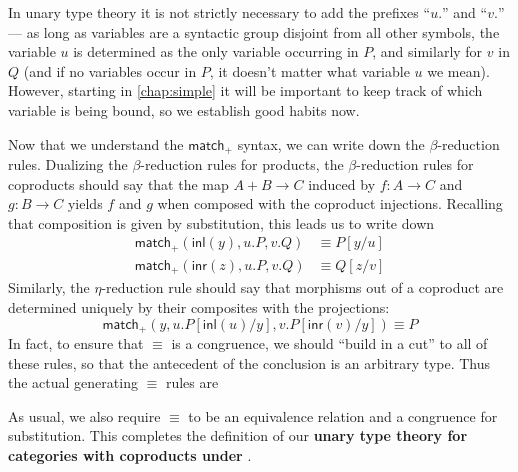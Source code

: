 \documentclass{book}
\let\types\vdash
\def\inl{\mathsf{inl}}
\def\inr{\mathsf{inr}}
\def\case{\mathsf{match}_+}
\begin{document}
\begin{rmk}
  In unary type theory it is not strictly necessary to add the prefixes ``$u.$'' and ``$v.$'' --- as long as variables are a syntactic group disjoint from all other symbols, the variable $u$ is determined as the only variable occurring in $P$, and similarly for $v$ in $Q$ (and if no variables occur in $P$, it doesn't matter what variable $u$ we mean).
  However, starting in \cref{chap:simple} it will be important to keep track of which variable is being bound, so we establish good habits now.
\end{rmk}

Now that we understand the $\case$ syntax, we can write down the $\beta$-reduction rules.
Dualizing the $\beta$-reduction rules for products, the $\beta$-reduction rules for coproducts should say that the map $A+B\to C$ induced by $f:A\to C$ and $g:B\to C$ yields $f$ and $g$ when composed with the coproduct injections.
Recalling that composition is given by substitution, this leads us to write down
\begin{align*}
  \case(\inl(y),u.P,v.Q) &\equiv P[y/u]\\
  \case(\inr(z),u.P,v.Q) &\equiv Q[z/v]
\end{align*}
Similarly, the $\eta$-reduction rule should say that morphisms out of a coproduct are determined uniquely by their composites with the projections:
\[ \case(y,u.P[\inl(u)/y],v.P[\inr(v)/y]) \equiv P \]
In fact, to ensure that $\equiv$ is a congruence, we should ``build in a cut'' to all of these rules, so that the antecedent of the conclusion is an arbitrary type.
Thus the actual generating $\equiv$ rules are
As usual, we also require $\equiv$ to be an equivalence relation and a congruence for substitution.
This completes the definition of our \textbf{unary type theory for categories with coproducts under \cG}.
\end{document}
